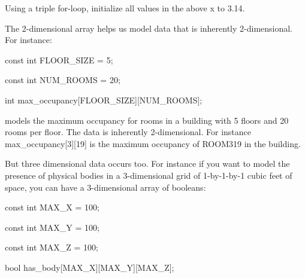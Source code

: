 \begin{ex}
Using a triple for-loop, initialize all values in the above x to 3.14.

The 2-dimensional array helps us model data that is inherently
2-dimensional. For instance:

\begin{consolethree}
const int FLOOR_SIZE = 5;

const int NUM_ROOMS = 20;

int max_occupancy[FLOOR_SIZE][NUM_ROOMS];

models the maximum occupancy for rooms in a building with 5 floors and
20 rooms per floor. The data is inherently 2-dimensional. For instance
max_occupancy[3][19] is the maximum occupancy of ROOM319 in the
building.

But three dimensional data occurs too. For instance if you want to model
the presence of physical bodies in a 3-dimensional grid of 1-by-1-by-1
cubic feet of space, you can have a 3-dimensional array of booleans:

const int MAX_X = 100;

const int MAX_Y = 100;

const int MAX_Z = 100;

bool has_body[MAX_X][MAX_Y][MAX_Z];
\end{consolethree}

\end{ex}
